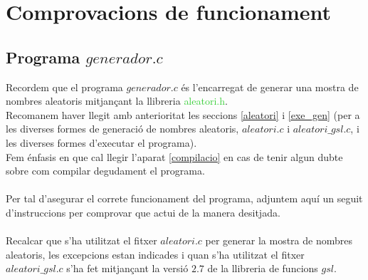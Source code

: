 \documentclass[a4paper, 11pt]{article}
\begin{document}
\newpage
\section{Comprovacions de funcionament} \label{comprovacions}
\subsection{Programa $generador.c$}
Recordem que el programa $generador.c$ és l'encarregat de generar una mostra de nombres aleatoris mitjançant la llibreria \textcolor{LimeGreen}{aleatori.h}. \\
Recomanem haver llegit amb anterioritat les seccions \textcolor{blue}{\ref{aleatori}} i \textcolor{blue}{\ref{exe_gen}} (per a les diverses formes de generació de nombres aleatoris, $aleatori.c$ i $aleatori\_gsl.c$, i les diverses formes d'executar el programa).\\
Fem énfasis en que cal llegir l'aparat \textcolor{blue}{\ref{compilacio}} en cas de tenir algun dubte sobre com compilar degudament el programa.\\\\
Per tal d'asegurar el correte funcionament del programa, adjuntem aquí un seguit d'instruccions per comprovar que actui de la manera desitjada.\\\\
Recalcar que s'ha utilitzat el fitxer $aleatori.c$ per generar la mostra de nombres aleatoris, les excepcions estan indicades i quan s'ha utilitzat el fitxer $aleatori\_gsl.c$ s'ha fet mitjançant la versió $2.7$ de la llibreria de funcions $gsl$.
\newpage
\end{document}
